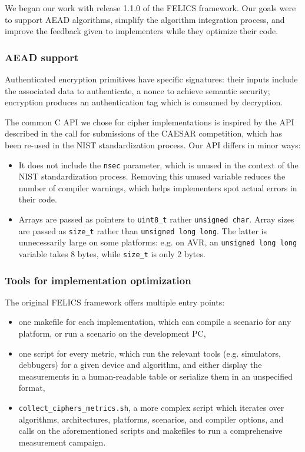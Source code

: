 \documentclass{article}
\begin{document}
We began our work with release 1.1.0 of the FELICS framework.  Our
goals were to support AEAD algorithms, simplify the algorithm
integration process, and improve the feedback given to implementers
while they optimize their code.

\subsubsection{AEAD support}
\label{sec:felics-ae/aead-support}

Authenticated encryption primitives have specific signatures: their
inputs include the associated data to authenticate, a nonce to achieve
semantic security\cite{Rogaway:AEAD}; encryption produces an
authentication tag which is consumed by decryption.

The common C API we chose for cipher implementations is inspired by
the API described in the call for submissions of the CAESAR
competition\cite{CAESAR:call}, which has been re-used in the NIST
standardization process\cite{NIST:LWC-requirements}.  Our API differs
in minor ways:

\begin{itemize}
\item It does not include the \texttt{nsec} parameter, which is unused
  in the context of the NIST standardization process.  Removing this
  unused variable reduces the number of compiler warnings, which helps
  implementers spot actual errors in their code.
\item Arrays are passed as pointers to \texttt{uint8\_t} rather
  \texttt{unsigned char}.  Array sizes are passed as \texttt{size\_t}
  rather than \texttt{unsigned long long}.  The latter is
  unnecessarily large on some platforms: e.g. on AVR, an
  \texttt{unsigned long long} variable takes 8 bytes, while
  \texttt{size\_t} is only 2 bytes.
\end{itemize}

\subsubsection{Tools for implementation optimization}
\label{sec:felics-ae/tools-opt}

The original FELICS framework offers multiple entry points:

\begin{itemize}
\item one makefile for each implementation, which can compile a
  scenario for any platform, or run a scenario on the development PC,
\item one script for every metric, which run the relevant tools
  (e.g. simulators, debbugers) for a given device and algorithm, and
  either display the measurements in a human-readable table or
  serialize them in an unspecified format,
\item \texttt{collect\_ciphers\_metrics.sh}, a more complex script
  which iterates over algorithms, architectures, platforms, scenarios,
  and compiler options, and calls on the aforementioned scripts and
  makefiles to run a comprehensive measurement campaign.
\end{itemize}
\end{document}
